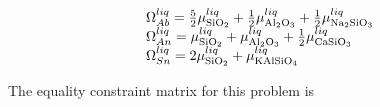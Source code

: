 \documentclass[11pt, titlepage, twoside]{article}
\begin{document}
\begin{MPEquation}[!ht]
\begin{equation}
\begin{array}{l}
\Omega _{Ab}^{liq} = \frac{5}{2}\mu _{{\rm{Si}}{{\rm{O}}_2}}^{liq} + \frac{1}{2}\mu _{{\rm{A}}{{\rm{l}}_2}{{\rm{O}}_3}}^{liq} + \frac{1}{2}\mu _{{\rm{N}}{{\rm{a}}_{\rm{2}}}{\rm{Si}}{{\rm{O}}_3}}^{liq}\\
\Omega _{An}^{liq} = \mu _{{\rm{Si}}{{\rm{O}}_2}}^{liq} + \mu _{{\rm{A}}{{\rm{l}}_2}{{\rm{O}}_3}}^{liq} + \frac{1}{2}\mu _{{\rm{CaSi}}{{\rm{O}}_3}}^{liq}\\
\Omega _{Sn}^{liq} = 2\mu _{{\rm{Si}}{{\rm{O}}_2}}^{liq} + \mu _{{\rm{KAlSi}}{{\rm{O}}_4}}^{liq}
\end{array}
\end{equation}
\label{MPEquationElement:097C97FD-5B1F-4BAA-C271-2B18E255EFDC}
\end{MPEquation}


The equality constraint matrix for this problem is
\end{document}
